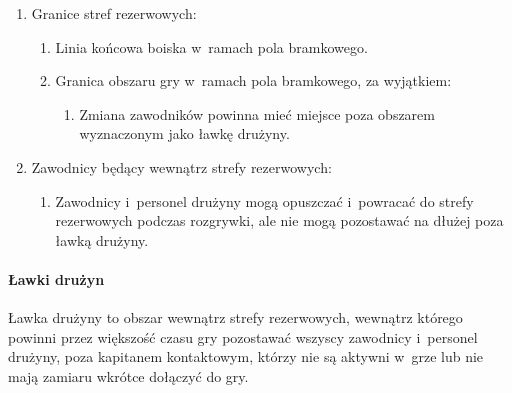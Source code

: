 \documentclass[12pt,a4paper]{article}
\begin{document}
\begin{enumerate}
	\item Granice stref rezerwowych:
	      \begin{enumerate}
		      \item Linia końcowa boiska w~ramach pola bramkowego.

		      \item Granica obszaru gry w~ramach pola bramkowego, za wyjątkiem:
		            \begin{enumerate}
			            \item Zmiana zawodników powinna mieć miejsce poza obszarem wyznaczonym jako
			                  ławkę drużyny.
		            \end{enumerate}
	      \end{enumerate}

	\item Zawodnicy będący wewnątrz strefy rezerwowych:
	      \begin{enumerate}
		      \item Zawodnicy i~personel drużyny mogą opuszczać i~powracać do strefy
		            rezerwowych podczas rozgrywki, ale nie mogą pozostawać na dłużej poza
		            ławką drużyny.
	      \end{enumerate}
\end{enumerate}

\paragraph{Ławki drużyn}
Ławka drużyny to obszar wewnątrz strefy
rezerwowych, wewnątrz którego powinni przez większość czasu gry
pozostawać wszyscy zawodnicy i~personel drużyny, poza kapitanem
kontaktowym, którzy nie są aktywni w~grze lub nie mają zamiaru wkrótce
dołączyć do gry.
\end{document}
